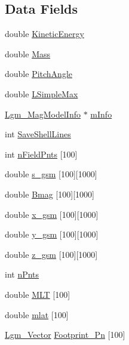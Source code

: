 \subsection*{Data Fields}
\begin{CompactItemize}
\item 
double \hyperlink{struct_lgm___lstar_info_869c8a1c2af0f48c6e871b08c13d2852}{KineticEnergy}
\item 
double \hyperlink{struct_lgm___lstar_info_c33418187547ea28dda7063924f34df6}{Mass}
\item 
double \hyperlink{struct_lgm___lstar_info_86da8321817d74036d3ff23e8643dc68}{PitchAngle}
\item 
double \hyperlink{struct_lgm___lstar_info_5d743063aa757414e17e949240d3c85b}{LSimpleMax}
\item 
\hyperlink{struct_lgm___mag_model_info}{Lgm\_\-MagModelInfo} $\ast$ \hyperlink{struct_lgm___lstar_info_c8b439eddbb4183c79fe090c634587a5}{mInfo}
\item 
int \hyperlink{struct_lgm___lstar_info_5e915118a580b5fdd3fc46cb0a09d618}{SaveShellLines}
\item 
int \hyperlink{struct_lgm___lstar_info_09227be97e257b54115370b3a6a7068d}{nFieldPnts} \mbox{[}100\mbox{]}
\item 
double \hyperlink{struct_lgm___lstar_info_1afc9fdd1806999a43e3c0ca0e6f7439}{s\_\-gsm} \mbox{[}100\mbox{]}\mbox{[}1000\mbox{]}
\item 
double \hyperlink{struct_lgm___lstar_info_7863fc2c379717c21a5bb5e3f217a74b}{Bmag} \mbox{[}100\mbox{]}\mbox{[}1000\mbox{]}
\item 
double \hyperlink{struct_lgm___lstar_info_fc2724b1c578713a685b87b9e12ea4b0}{x\_\-gsm} \mbox{[}100\mbox{]}\mbox{[}1000\mbox{]}
\item 
double \hyperlink{struct_lgm___lstar_info_713bca9193697dece782322446d6bf4f}{y\_\-gsm} \mbox{[}100\mbox{]}\mbox{[}1000\mbox{]}
\item 
double \hyperlink{struct_lgm___lstar_info_42b27005ed6595929e25c1e9ca6b9f8d}{z\_\-gsm} \mbox{[}100\mbox{]}\mbox{[}1000\mbox{]}
\item 
int \hyperlink{struct_lgm___lstar_info_e64e724dd0713b2ba2fca5aedab3fd34}{nPnts}
\item 
double \hyperlink{struct_lgm___lstar_info_81220a2a156b6eaf6e17f742e55648e0}{MLT} \mbox{[}100\mbox{]}
\item 
double \hyperlink{struct_lgm___lstar_info_34853551c7862f1bca3adc0be7482483}{mlat} \mbox{[}100\mbox{]}
\item 
\hyperlink{struct_lgm___vector}{Lgm\_\-Vector} \hyperlink{struct_lgm___lstar_info_9548ca1b43dee446afddb58200852ac4}{Footprint\_\-Pn} \mbox{[}100\mbox{]}

\end{CompactItemize}
